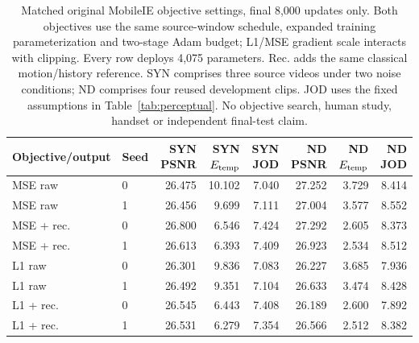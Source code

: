 \begin{table}[t]
\centering\scriptsize\setlength{\tabcolsep}{4pt}
\caption{Matched original MobileIE objective settings, final 8,000 updates only. Both objectives use the same source-window schedule, expanded training parameterization and two-stage Adam budget; L1/MSE gradient scale interacts with clipping. Every row deploys 4,075 parameters. Rec. adds the same classical motion/history reference. SYN comprises three source videos under two noise conditions; ND comprises four reused development clips. JOD uses the fixed assumptions in Table~\ref{tab:perceptual}. No objective search, human study, handset or independent final-test claim.}
\label{tab:matched-objective}
\begin{tabular}{llrrrrrr}
\toprule
Objective/output & Seed & SYN PSNR & SYN $E_{\rm temp}$ & SYN JOD & ND PSNR & ND $E_{\rm temp}$ & ND JOD\\
\midrule
MSE raw & 0 & 26.475 & 10.102 & 7.040 & 27.252 & 3.729 & 8.414\\
MSE raw & 1 & 26.456 & 9.699 & 7.111 & 27.004 & 3.577 & 8.552\\
MSE + rec. & 0 & 26.800 & 6.546 & 7.424 & 27.292 & 2.605 & 8.373\\
MSE + rec. & 1 & 26.613 & 6.393 & 7.409 & 26.923 & 2.534 & 8.512\\
L1 raw & 0 & 26.301 & 9.836 & 7.083 & 26.227 & 3.685 & 7.936\\
L1 raw & 1 & 26.492 & 9.351 & 7.104 & 26.633 & 3.474 & 8.428\\
L1 + rec. & 0 & 26.545 & 6.443 & 7.408 & 26.189 & 2.600 & 7.892\\
L1 + rec. & 1 & 26.531 & 6.279 & 7.354 & 26.566 & 2.512 & 8.382\\
\bottomrule
\end{tabular}
\end{table}
